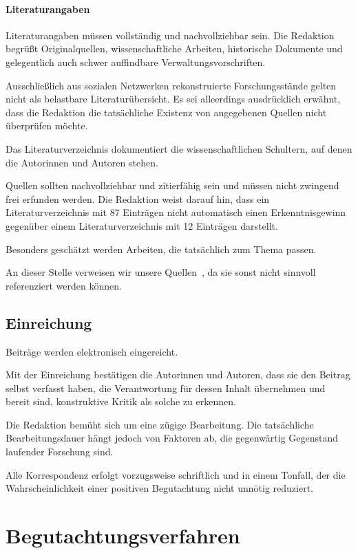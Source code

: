 \documentclass[research]{zal}
\begin{document}
\paragraph{Literaturangaben}

Literaturangaben müssen vollständig und nachvollziehbar sein. Die Redaktion begrüßt Originalquellen, wissenschaftliche Arbeiten, historische Dokumente und gelegentlich auch schwer auffindbare Verwaltungsvorschriften.

Ausschließlich aus sozialen Netzwerken rekonstruierte Forschungsstände gelten nicht als belastbare Literaturübersicht. Es sei alleerdings ausdrücklich erwähnt, dass die Redaktion die tatsächliche Existenz von angegebenen Quellen nicht überprüfen möchte.

Das Literaturverzeichnis dokumentiert die wissenschaftlichen Schultern, auf denen die Autorinnen und Autoren stehen.

Quellen sollten nachvollziehbar und zitierfähig sein und müssen nicht zwingend frei erfunden werden. Die Redaktion weist darauf hin, dass ein Literaturverzeichnis mit 87 Einträgen nicht automatisch einen Erkenntnisgewinn gegenüber einem Literaturverzeichnis mit 12 Einträgen darstellt.

Besonders geschätzt werden Arbeiten, die tatsächlich zum Thema passen.

An dieser Stelle verweisen wir unsere Quellen~\cite{1,2,3,4}, da sie sonst nicht sinnvoll referenziert werden können.

\subsection{Einreichung}

Beiträge werden elektronisch eingereicht.

Mit der Einreichung bestätigen die Autorinnen und Autoren, dass sie den Beitrag selbst verfasst haben, die Verantwortung für dessen Inhalt übernehmen und bereit sind, konstruktive Kritik als solche zu erkennen.

Die Redaktion bemüht sich um eine zügige Bearbeitung. Die tatsächliche Bearbeitungsdauer hängt jedoch von Faktoren ab, die gegenwärtig Gegenstand laufender Forschung sind.

Alle Korrespondenz erfolgt vorzugsweise schriftlich und in einem Tonfall, der die Wahrscheinlichkeit einer positiven Begutachtung nicht unnötig reduziert.

\section{Begutachtungsverfahren}
\end{document}

